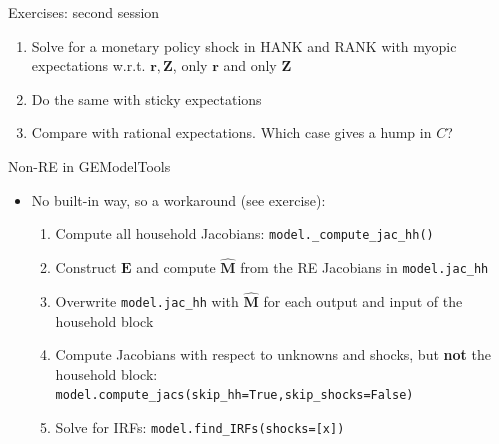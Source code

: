 \documentclass[10pt,english]{beamer}
\begin{document}
\begin{frame}{Exercises: second session}
\begin{enumerate}
\item <+->Solve for a monetary policy shock in HANK and RANK with myopic expectations w.r.t. $\boldsymbol{r},\boldsymbol{Z}$, only $\boldsymbol{r}$ and only $\boldsymbol{Z}$
\item <+->Do the same with sticky expectations
\item <+->Compare with rational expectations. Which case gives a hump in $C$?
\end{enumerate}
\end{frame}
%
\begin{frame}{Non-RE in GEModelTools}
\begin{itemize}
\item <+->No built-in way, so a workaround (see exercise):
\begin{enumerate}
\item <+->Compute all household Jacobians: \lstinline{model._compute_jac_hh()}
\item <+->Construct $\boldsymbol{E}$ and compute $\hat{\boldsymbol{M}}$ from the RE Jacobians in \lstinline{model.jac_hh}
\item <+->Overwrite \lstinline{model.jac_hh} with $\hat{\boldsymbol{M}}$ for each output and input of the household block
\item <+->Compute Jacobians with respect to unknowns and shocks, but \textbf{not} the household block: \lstinline{model.compute_jacs(skip_hh=True,skip_shocks=False)}
\item <+->Solve for IRFs: \lstinline{model.find_IRFs(shocks=[x])}
\end{enumerate}
\end{itemize}
\end{frame}
%
\end{document}
